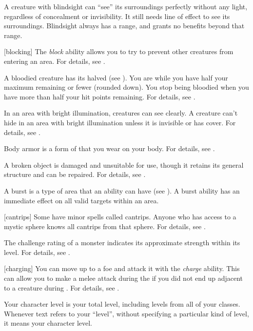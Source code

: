  A creature with blindsight can ``see'' its surroundings perfectly without any light, regardless of concealment or invisibility.
It still needs line of effect to see its surroundings.
Blindsight always has a range, and grants no benefits beyond that range.

[blocking] The \textit{block} ability allows you to try to prevent other creatures from entering an area.
For details, see .

 A bloodied creature has its  halved (see ).
You are  while you have half your maximum  remaining or fewer (rounded down).
You stop being bloodied when you have more than half your hit points remaining.
For details, see .

 In an area with bright illumination, creatures can see clearly.
A creature can't hide in an area with bright illumination unless it is invisible or has cover.
For details, see .

 Body armor is a form of  that you wear on your body.
For details, see .

 A broken object is damaged and unsuitable for use, though it retains its general structure and can be repaired.
For details, see .

 A burst is a type of area that an ability can have (see ).
A burst ability has an immediate effect on all valid targets within an area.

[cantrips] Some  have minor spells called cantrips.
Anyone who has access to a mystic sphere knows all cantrips from that sphere.
For details, see .

 The challenge rating of a monster indicates its approximate strength within its level.
For details, see .

[charging] You can move up to a foe and attack it with the \textit{charge} ability.
This can allow you to make a melee attack during the  if you did not end up adjacent to a creature during .
For details, see .

 Your character level is your total level, including levels from all of your classes.
Whenever text refers to your ``level'', without specifying a particular kind of level, it means your character level.

